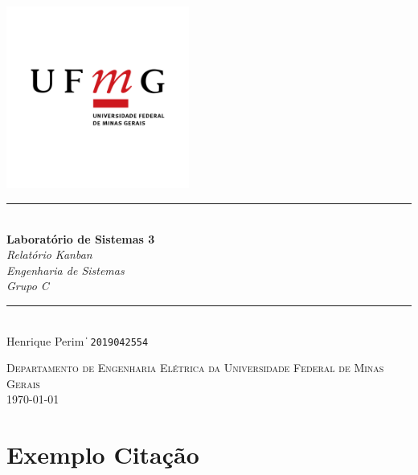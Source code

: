 \documentclass[12pt,a4paper]{article}
\newcommand{\HRule}{\rule{\linewidth}{0.5mm}} %
\begin{document}
\begin{titlepage}
\begin{center}

~\\[1.5cm]
\includegraphics[width=0.45\textwidth]{UFMG.png}~\\[1.5cm]

\HRule \\[0.4cm]
{ \LARGE 
  \textbf{Laboratório de Sistemas 3}\\[0.4cm]
  \emph{Relatório Kanban}\\[0.4cm]
  \emph{Engenharia de Sistemas}\\[0.3cm]
  \emph{Grupo C}\\[0.3cm]
}
\HRule \\[1.5cm]

{ \large
  Henrique Perim {\|} \texttt{2019042554} \\[0.1cm]
}

\vfill

\textsc{\large Departamento de Engenharia Elétrica da Universidade Federal de Minas Gerais}\\[0.4cm]

{\large \today}

\end{center}
\end{titlepage}

\newpage
\tableofcontents %
\newpage

\setcounter{page}{1}


\section{Exemplo Citação}
\end{document}
